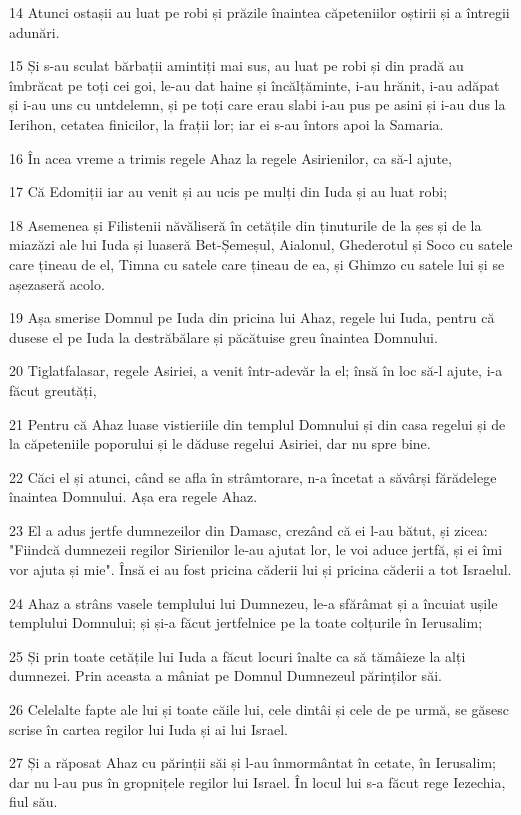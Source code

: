 \par 14 Atunci ostașii au luat pe robi și prăzile înaintea căpeteniilor oștirii și a întregii adunări.
\par 15 Și s-au sculat bărbații amintiți mai sus, au luat pe robi și din pradă au îmbrăcat pe toți cei goi, le-au dat haine și încălțăminte, i-au hrănit, i-au adăpat și i-au uns cu untdelemn, și pe toți care erau slabi i-au pus pe asini și i-au dus la Ierihon, cetatea finicilor, la frații lor; iar ei s-au întors apoi la Samaria.
\par 16 În acea vreme a trimis regele Ahaz la regele Asirienilor, ca să-l ajute,
\par 17 Că Edomiții iar au venit și au ucis pe mulți din Iuda și au luat robi;
\par 18 Asemenea și Filistenii năvăliseră în cetățile din ținuturile de la șes și de la miazăzi ale lui Iuda și luaseră Bet-Șemeșul, Aialonul, Ghederotul și Soco cu satele care țineau de el, Timna cu satele care țineau de ea, și Ghimzo cu satele lui și se așezaseră acolo.
\par 19 Așa smerise Domnul pe Iuda din pricina lui Ahaz, regele lui Iuda, pentru că dusese el pe Iuda la destrăbălare și păcătuise greu înaintea Domnului.
\par 20 Tiglatfalasar, regele Asiriei, a venit într-adevăr la el; însă în loc să-l ajute, i-a făcut greutăți,
\par 21 Pentru că Ahaz luase vistieriile din templul Domnului și din casa regelui și de la căpeteniile poporului și le dăduse regelui Asiriei, dar nu spre bine.
\par 22 Căci el și atunci, când se afla în strâmtorare, n-a încetat a săvârși fărădelege înaintea Domnului. Așa era regele Ahaz.
\par 23 El a adus jertfe dumnezeilor din Damasc, crezând că ei l-au bătut, și zicea: "Fiindcă dumnezeii regilor Sirienilor le-au ajutat lor, le voi aduce jertfă, și ei îmi vor ajuta și mie". Însă ei au fost pricina căderii lui și pricina căderii a tot Israelul.
\par 24 Ahaz a strâns vasele templului lui Dumnezeu, le-a sfărâmat și a încuiat ușile templului Domnului; și și-a făcut jertfelnice pe la toate colțurile în Ierusalim;
\par 25 Și prin toate cetățile lui Iuda a făcut locuri înalte ca să tămâieze la alți dumnezei. Prin aceasta a mâniat pe Domnul Dumnezeul părinților săi.
\par 26 Celelalte fapte ale lui și toate căile lui, cele dintâi și cele de pe urmă, se găsesc scrise în cartea regilor lui Iuda și ai lui Israel.
\par 27 Și a răposat Ahaz cu părinții săi și l-au înmormântat în cetate, în Ierusalim; dar nu l-au pus în gropnițele regilor lui Israel. În locul lui s-a făcut rege Iezechia, fiul său.


